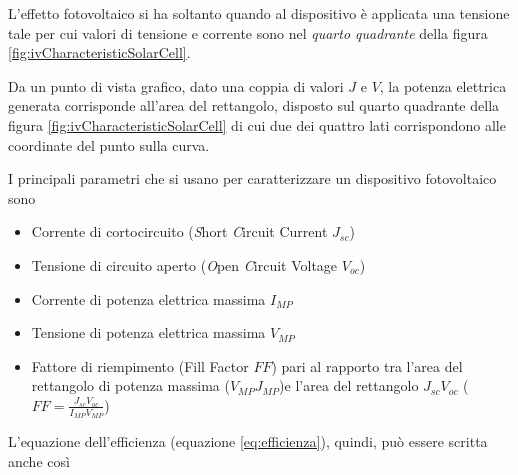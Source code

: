 \documentclass[17pt]{extarticle}
\begin{document}
L'effetto fotovoltaico si ha soltanto quando al dispositivo è applicata una tensione tale per cui valori di tensione e corrente sono nel \emph{quarto quadrante} della figura \ref{fig:ivCharacteristicSolarCell}.


Da un punto di vista grafico, dato una coppia di valori $J$ e $V$, la potenza elettrica generata corrisponde all'area del rettangolo, disposto sul quarto quadrante della figura \ref{fig:ivCharacteristicSolarCell} di cui due dei quattro lati corrispondono alle coordinate del punto sulla curva.





I principali parametri che si usano per caratterizzare un dispositivo fotovoltaico sono

\begin{itemize}%
	\item Corrente di cortocircuito (\emph{S}hort \emph{C}ircuit Current $J_{sc}$)
	\item Tensione di circuito aperto (\emph{O}pen \emph{C}ircuit Voltage $V_{oc}$)
	\item Corrente di potenza elettrica massima $I_{MP}$
	\item Tensione di potenza elettrica massima $V_{MP}$
	\item Fattore di riempimento (Fill Factor $FF$) pari al rapporto tra l'area del rettangolo di potenza massima ($V_{MP}J_{MP}$)e l'area del rettangolo $J_{sc}V_{oc}$  ($FF =\frac{J_{sc}V_{oc}}{I_{MP}V_{MP}}$)
\end{itemize}

L'equazione dell'efficienza (equazione \ref{eq:efficienza}), quindi, può essere scritta anche così
\end{document}
